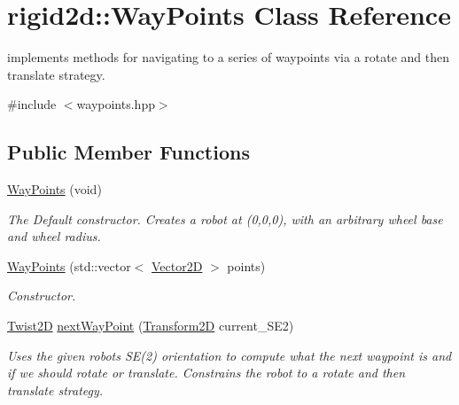 \hypertarget{classrigid2d_1_1WayPoints}{}\section{rigid2d\+:\+:Way\+Points Class Reference}
\label{classrigid2d_1_1WayPoints}


implements methods for navigating to a series of waypoints via a rotate and then translate strategy.  




{\ttfamily \#include $<$waypoints.\+hpp$>$}

\subsection*{Public Member Functions}
\begin{DoxyCompactItemize}
\item 
\mbox{\label{classrigid2d_1_1WayPoints_a4dcf881b5408aae8ad77256eff299e1e}} 
\hyperlink{classrigid2d_1_1WayPoints_a4dcf881b5408aae8ad77256eff299e1e}{Way\+Points} (void)
\begin{DoxyCompactList}\small\item\em The Default constructor. Creates a robot at (0,0,0), with an arbitrary wheel base and wheel radius. \end{DoxyCompactList}\item 
\hyperlink{classrigid2d_1_1WayPoints_abdfac145bd6c5ab064876e7c9934dcd9}{Way\+Points} (std\+::vector$<$ \hyperlink{structrigid2d_1_1Vector2D}{Vector2D} $>$ points)
\begin{DoxyCompactList}\small\item\em Constructor. \end{DoxyCompactList}\item 
\hyperlink{classrigid2d_1_1Twist2D}{Twist2D} \hyperlink{classrigid2d_1_1WayPoints_ab196e9fa96a7de086586e787b99af600}{next\+Way\+Point} (\hyperlink{classrigid2d_1_1Transform2D}{Transform2D} current\+\_\+\+S\+E2)
\begin{DoxyCompactList}\small\item\em Uses the given robot\textquotesingle{}s S\+E(2) orientation to compute what the next waypoint is and if we should rotate or translate. Constrains the robot to a rotate and then translate strategy. \end{DoxyCompactList}\end{DoxyCompactItemize}
